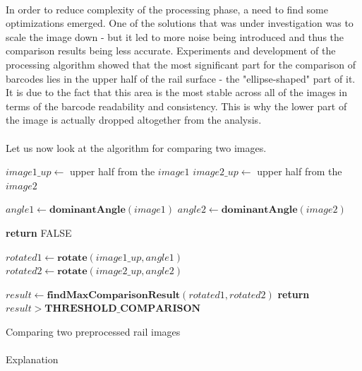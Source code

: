 \paragraph{}
In order to reduce complexity of the processing phase, a need to find some optimizations emerged. One of the solutions that was under investigation was to scale the image down - but it led to more noise being introduced and thus the comparison results being less accurate. Experiments and development of the processing algorithm showed that the most significant part for the comparison of barcodes lies in the upper half of the rail surface - the "ellipse-shaped" part of it. It is due to the fact that this area is the most stable across all of the images in terms of the barcode readability and consistency. This is why the lower part of the image is actually dropped altogether from the analysis.

\paragraph{}
Let us now look at the algorithm for comparing two images. 

\begin{algorithm}
	\begin{spacing}{1.5}
	\begin{algorithmic}[1]
			\State $image1\_up \gets$ upper half from the $image1$
			\State $image2\_up \gets$ upper half from the $image2$
			
			\State $angle1 \gets \textbf{dominantAngle}(image1)$
			\State $angle2 \gets \textbf{dominantAngle}(image2)$
			
				\State \textbf{return} FALSE
			\EndIf
			
			\State $rotated1 \gets \textbf{rotate}(image1\_up, angle1)$
			\State $rotated2 \gets \textbf{rotate}(image2\_up, angle2)$
			
			\State $result \gets \textbf{findMaxComparisonResult}(rotated1, rotated2)$
			\State \textbf{return} $result > \textbf{THRESHOLD\_COMPARISON}$
		\EndFunction
	\end{algorithmic}
	\end{spacing}
	\caption{Comparing two preprocessed rail images}
\end{algorithm}

\paragraph{}
Explanation

